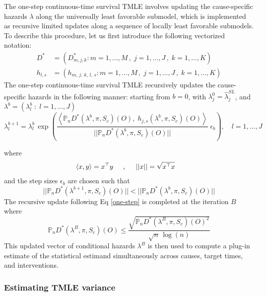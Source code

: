 The one-step continuous-time survival TMLE \citep{rytgaard_one-step_2021} involves updating the cause-specific hazards \(\lambda\) along the universally least favorable submodel, which is implemented as recursive limited updates along a sequence of locally least favorable submodels. To describe this procedure, let us first introduce the following vectorized notation: \begin{align*}
{D}^{*} &= \left(D^*_{m, {j}, k} : m = 1,\dots,M \,,\; {j}=1,\dots,J \,,\; k=1,\dots,K\right)\\
h_{{l}, s} &= \left(h_{m,\, {j},\, k,\, {l},\, s} : m = 1,\dots,M \,,\; {j}=1,\dots,J \,,\; k=1,\dots,K\right)
\end{align*} The one-step continuous-time survival TMLE recursively updates the cause-specific hazards in the following manner: starting from \(b=0\), with \(\lambda^0_j = \hat{\lambda}^{SL}_j\), and \(\lambda^b = \left(\lambda^b_l \;:\; l = 1, \dots, J\right)\) \begin{equation}
\lambda^{b+1}_{l} = \lambda^{b}_l \, \exp \left( \frac{\left<\mathbb{P}_n {D}^*( \lambda^b, {\pi},  S_c)(O),\; h_{j, s}( \lambda^b, {\pi},  S_c)(O) \right>}{|| \mathbb{P}_n {D}^*( \lambda^b, {\pi}, S_c)(O)||} \; \epsilon_b\right), \quad l = 1,\dots,J \label{one-step}
\end{equation}

where \begin{align*}
\left<x , y \right>& = x^\top y \hspace{.5cm}, \hspace{.5cm} ||x|| = \sqrt{x^\top x}
\end{align*} and the step sizes \(\epsilon_b\) are chosen such that \[|| \mathbb{P}_n {D}^*( \lambda^{b+1}, {\pi}, S_c)(O)|| < || \mathbb{P}_n {D}^*( \lambda^{b}, {\pi}, S_c)(O)||\] The recursive update following Eq \eqref{one-step} is completed at the iteration \(B\) where \begin{equation}
\mathbb{P}_n {D}^*( \lambda^B, {\pi}, S_c)(O) \leq \frac{\sqrt{\mathbb{P}_n {D}^*( \lambda^B, {\pi}, S_c)(O)^2}}{\sqrt{n} \, \log(n)} \label{one-step-stop}
\end{equation} This updated vector of conditional hazards \(\lambda^B\) is then used to compute a plug-in estimate of the statistical estimand simultaneously across causes, target times, and interventions.

\hypertarget{sec-variance}{%
\subsubsection{Estimating TMLE variance}\label{sec-variance}}


